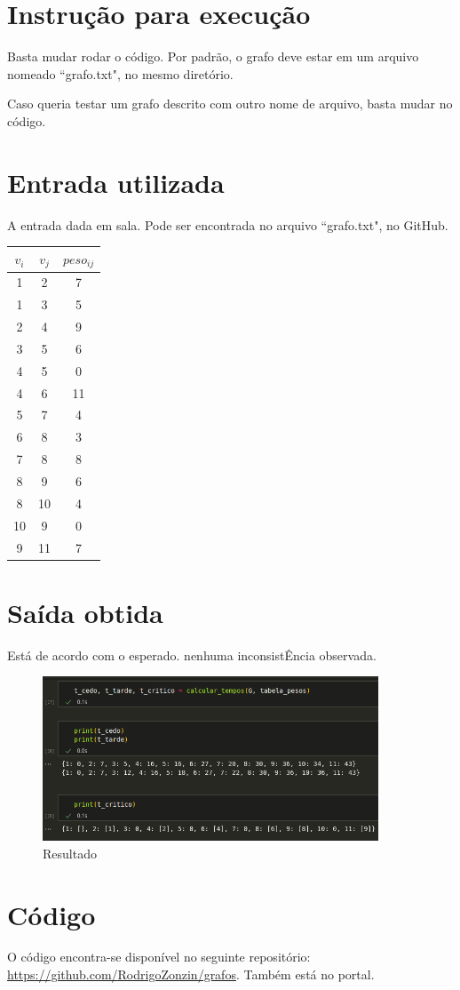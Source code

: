 \section{Instrução para execução}
	Basta mudar rodar o código. Por padrão, o grafo deve estar em um arquivo nomeado ``grafo.txt", no mesmo diretório. 

	Caso queria testar um grafo descrito com outro nome de arquivo, basta mudar no código.  

\section{Entrada utilizada}
	A entrada dada em sala. Pode ser encontrada no arquivo ``grafo.txt", no GitHub. 

	\begin{table}[h!]
		\centering
		\begin{tabular}{ccc}
			\hline
			$v_i$ & $v_j$ & $peso_{ij}$ \\
			\hline
			1 & 2 & 7 \\
			1 & 3 & 5 \\
			2 & 4 & 9 \\
			3 & 5 & 6 \\
			4 & 5 & 0 \\
			4 & 6 & 11 \\
			5 & 7 & 4 \\
			6 & 8 & 3 \\
			7 & 8 & 8 \\
			8 & 9 & 6 \\
			8 & 10 & 4 \\
			10 & 9 & 0 \\
			9 & 11 & 7 \\
			\hline
		\end{tabular}
	\end{table}

	\section{Saída obtida}
	Está de acordo com o esperado. nenhuma inconsistÊncia observada. 

	\begin{figure}[h!]
		\centering

		\includegraphics[width = 10cm]{resultado.png}
		\caption{Resultado}
	\end{figure}

\newpage


\section{Código}
O código encontra-se disponível no seguinte repositório: 
\href{https://github.com/RodrigoZonzin/grafos}{https://github.com/RodrigoZonzin/grafos}. Também está no portal.